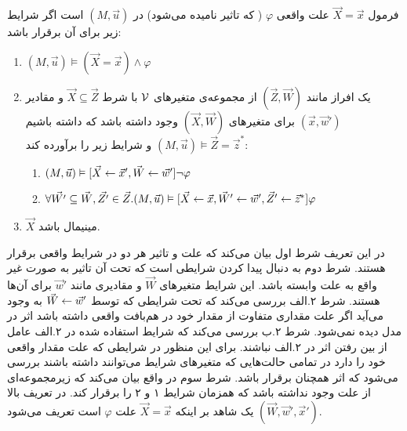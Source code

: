 \begin{definition}
      فرمول
      $\vec X = \vec x$
      علت واقعی
      $\varphi$
      (
      که تاثیر
      نامیده می‌شود)
      در
      $(M,\vec{u})$
      است
      اگر شرایط زیر برای آن برقرار باشد:
      \begin{enumerate}
            \item $(M,\vec{u}) \vDash (\vec{X} = \vec{x}) \wedge \varphi$
            \item یک افراز مانند
                  $(\vec{Z},\vec{W})$
                  از مجموعه‌ی متغیر‌های
                  $\mathcal{V}$
                  با شرط
                  $\vec{X} \subseteq \vec{Z}$
                  و مقادیر
                  $(\vec{x},\vec{w}')$
                  برای متغیر‌های
                  $(\vec{X},\vec{W})$
                  وجود داشته باشد که داشته باشیم
                  $(M,\vec{u})\vDash \vec{Z} = \vec{z}^*$
                  و شرایط زیر را برآورده کند:
                  \begin{enumerate}
                        \item $(M,\vec u)\vDash[\vec{X}\leftarrow\vec{x}',\vec{W}\leftarrow\vec{w}']
                                    \neg \varphi$
                        \item $\forall \vec{W'} \subseteq \vec{W},\vec{Z'}\in \vec{Z}.
                                    (M,\vec{u})\vDash [\vec X\leftarrow\vec x,\vec{W}'\leftarrow \vec{w}',\vec{Z}'\leftarrow \vec{z}^*]\varphi$
                  \end{enumerate}
            \item $\vec X$
                  مینیمال باشد.
      \end{enumerate}
\end{definition}
در این تعریف شرط اول بیان می‌کند که علت و تاثیر هر دو در شرایط واقعی برقرار هستند.
شرط دوم به دنبال پیدا کردن شرایطی است که تحت آن تاثیر به صورت غیر واقع به علت وابسته باشد.
این شرایط متغیرهای
$\vec W$
و مقادیری مانند
$\vec{w}'$
برای آن‌ها هستند.
شرط ۲.الف بررسی می‌کند که تحت شرایطی که توسط
$\vec W \leftarrow \vec{w}'$
به وجود می‌آید اگر علت مقداری متفاوت از مقدار خود در هم‌بافت واقعی داشته باشد اثر در مدل دیده نمی‌شود.
شرط ۲.ب بررسی می‌کند که شرایط
استفاده شده در ۲.الف عامل
از بین رفتن اثر در ۲.الف نباشند.
برای این منظور در شرایطی که علت مقدار واقعی خود را دارد در تمامی حالت‌هایی که متغیر‌های شرایط می‌توانند داشته باشند بررسی می‌شود که اثر همچنان برقرار باشد.
شرط سوم در واقع بیان می‌کند که زیرمجموعه‌ای از علت وجود نداشته باشد که همزمان شرایط ۱ و ۲ را برقرار کند.
در تعریف بالا
$(\vec W, \vec w',\vec x')$
یک شاهد
بر اینکه
$\vec X = \vec x$
علت
$\varphi$
است تعریف می‌شود.

